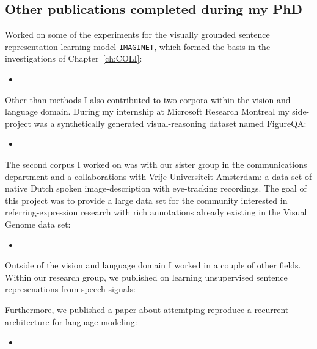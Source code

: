 \subsection{Other publications completed during my PhD}

Worked on some of the experiments for the visually grounded sentence representation learning
model \texttt{IMAGINET}, which formed the basis in the investigations of Chapter~\ref{ch:COLI}:

\begin{itemize}
\item {}
\end{itemize}

Other than methods I also contributed to two corpora within the vision and language domain.
During my internship at Microsoft Research Montreal my side-project was a synthetically generated visual-reasoning
dataset named FigureQA:

\begin{itemize}
\item {}
\end{itemize}

The second corpus I worked on was with our sister group in the communications department and a collaborations with 
Vrije Universiteit Amsterdam:  a data set of native Dutch spoken image-description with eye-tracking recordings.
The goal of this project was to provide a large data set for the community interested in referring-expression research
with rich annotations already existing in the Visual Genome data set:

\begin{itemize}
\item {}
\end{itemize}

Outside of the vision and language domain I worked in a couple of other fields.
Within our research group, we published on learning unsupervised sentence represenations
from speech signals:

\item {}

Furthermore, we published a paper about attemtping reproduce a 
recurrent architecture for language modeling:

\begin{itemize}
\item {}
\end{itemize}


